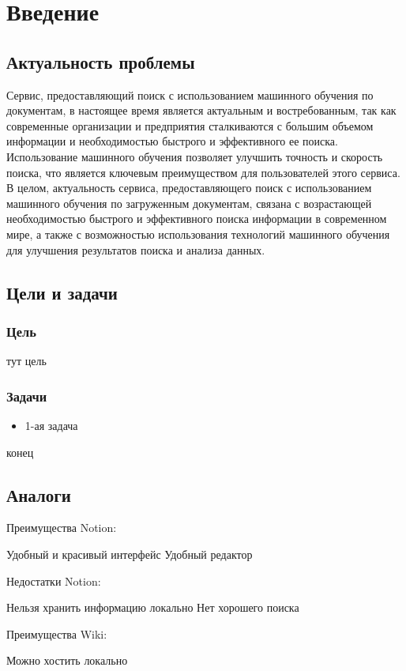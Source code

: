 \section{Введение}

\subsection{Актуальность проблемы}
Сервис, предоставляющий поиск с использованием машинного обучения по документам, 
в настоящее время является актуальным и востребованным, 
так как современные организации и предприятия сталкиваются с большим объемом информации и необходимостью быстрого и эффективного ее поиска. 
Использование машинного обучения позволяет улучшить точность и скорость поиска, 
что является ключевым преимуществом для пользователей этого сервиса. 
В целом, актуальность сервиса, предоставляющего поиск с использованием машинного обучения по загруженным документам, 
связана с возрастающей необходимостью быстрого и эффективного поиска информации в современном мире,
а также с возможностью использования технологий машинного обучения для улучшения результатов поиска и анализа данных.


\subsection{Цели и задачи}
\subsubsection{Цель}
тут цель
\subsubsection{Задачи}
\begin{itemize}
\item 1-ая задача
\end{itemize}
конец
\subsection{Аналоги}

Преимущества Notion:

Удобный и красивый интерфейс 
Удобный редактор

Недостатки Notion:

Нельзя хранить информацию локально
Нет хорошего поиска

Преимущества Wiki:

Можно хостить локально

